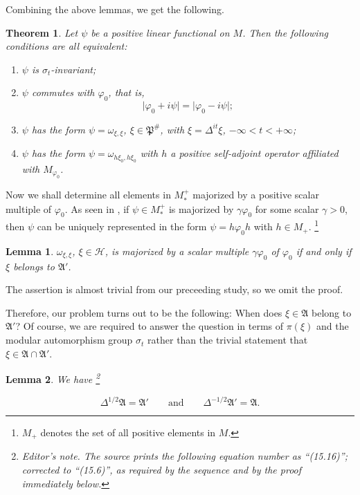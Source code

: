 \documentclass[12pt,b5paper,twoside]{article}
\theoremstyle{takesaki}
\newtheorem{theorem}{Theorem}[section]
\newtheorem{lemma}{Lemma}[section]
\numberwithin{equation}{section}
\newcounter{editorialnote}
\newcommand{\ednote}[1]{%
  \stepcounter{editorialnote}%
  \begingroup
  \renewcommand{\thefootnote}{E\arabic{editorialnote}}%
  \footnote{\textit{Editor's note.} #1}%
  \addtocounter{footnote}{-1}%
  \endgroup
}
\begin{document}
Combining the above lemmas, we get the following.

\begin{theorem}
\label{thm:15.2}
Let $\psi$ be a positive linear functional on $M$.  Then the following
conditions are all equivalent:
\begin{enumerate}[label=\arabic*$^{\circ}$]
  \item $\psi$ is $\sigma_t$-invariant;
  \item $\psi$ commutes with $\varphi_0$, that is,
  \[
    \lvert\varphi_0+i\psi\rvert=\lvert\varphi_0-i\psi\rvert;
  \]
  \item $\psi$ has the form $\psi=\omega_{\xi,\xi}$,
  $\xi\in\mathfrak P^{\#}$, with $\xi=\Delta^{it}\xi$,
  $-\infty<t<+\infty$;
  \item $\psi$ has the form
  $\psi=\omega_{h\xi_0,h\xi_0}$ with $h$ a positive self-adjoint
  operator affiliated with $M_{\varphi_0}$.
\end{enumerate}
\end{theorem}

Now we shall determine all elements in $M_*^+$ majorized by a positive
scalar multiple of $\varphi_0$.  As seen in , if
$\psi\in M_*^+$ is majorized by $\gamma\varphi_0$ for some scalar
$\gamma>0$, then $\psi$ can be uniquely represented in the form
$\psi=h\varphi_0h$ with $h\in M_+$.
\footnote{$M_+$ denotes the set of all positive elements in $M$.}

\begin{lemma}
\label{lem:15.12}
$\omega_{\xi,\xi}$, $\xi\in\mathcal H$, is majorized by a scalar
multiple $\gamma\varphi_0$ of $\varphi_0$ if and only if $\xi$ belongs
to $\mathfrak A'$.
\end{lemma}

The assertion is almost trivial from our preceeding study, so we omit
the proof.

Therefore, our problem turns out to be the following: When does
$\xi\in\mathfrak A$ belong to $\mathfrak A'$?  Of course, we are
required to answer the question in terms of $\pi(\xi)$ and the modular
automorphism group $\sigma_t$ rather than the trivial statement that
$\xi\in\mathfrak A\cap\mathfrak A'$.

\begin{lemma}
\label{lem:15.13}
We have\ednote{The source prints the following equation number as
``(15.16)''; corrected to ``(15.6)'', as required by the sequence and by
the proof immediately below.}
\begin{equation}
  \Delta^{1/2}\mathfrak A=\mathfrak A'
  \qquad\text{and}\qquad
  \Delta^{-1/2}\mathfrak A'=\mathfrak A.
  \tag{15.6}\label{eq:15.6}
\end{equation}
\end{lemma}
\end{document}

